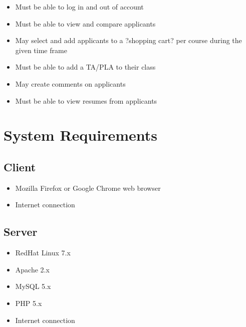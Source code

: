 \documentclass[11pt]{amsart}
\begin{document}
\begin{itemize}

\item{Must be able to log in and out of account}


\item{Must be able to view and compare applicants}


\item{May select and add applicants to a ?shopping cart? per course during the given time frame}


\item{Must be able to add a TA/PLA to their class}


\item{May create comments on applicants}


\item{Must be able to view resumes from applicants}


\end{itemize}


\section{System Requirements}
\subsection{Client}
\begin{itemize}
\item{Mozilla Firefox or Google Chrome web browser}
\item{Internet connection}
\end{itemize}

\subsection{Server}
\begin{itemize}
\item{RedHat Linux 7.x}
\item{Apache 2.x}
\item{MySQL 5.x}
\item{PHP 5.x}
\item{Internet connection}
\end{itemize}
\end{document}
